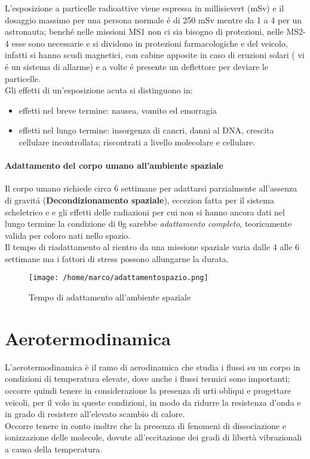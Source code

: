 \documentclass[10pt]{article}
\begin{document}
L'esposizione a particelle radioattive viene espressa in millisievert (mSv) e il dosaggio massimo per una persona normale é di 250 mSv mentre da 1 a 4 per un astronauta; benché nelle missioni MS1 non ci sia bisogno di protezioni, nelle MS2-4 esse sono necessarie e si dividono in protezioni farmacologiche e del veicolo, infatti si hanno scudi magnetici, con cabine apposite in caso di eruzioni solari ( vi é un sistema di allarme) e a volte é presente un deflettore per deviare le particelle. \\
Gli effetti di un'esposizione acuta si distinguono  in:
\begin{itemize}
\item effetti nel breve termine: nausea, vomito ed emorragia
\item effetti nel lungo termine: insorgenza di cancri, danni al DNA, crescita cellulare incontrollata; riscontrati a livello molecolare e cellulare.
\end{itemize}

\paragraph{Adattamento del corpo umano all'ambiente spaziale}

Il corpo umano richiede circa 6 settimane per adattarsi parzialmente all'assenza di gravitá (\textbf{Decondizionamento spaziale}), eccezion fatta per il sistema scheletrico e e gli effetti delle radiazioni per cui non si hanno ancora dati nel lungo termine \textrightarrow la condizione di 0g sarebbe \textit{adattamento completo}, teoricamente valida per coloro nati nello spazio. \\ Il tempo di riadattamento al rientro da una missione spaziale varia dalle 4 alle 6 settimane ma i fattori di stress possono allungarne la durata.

\begin{figure}[h!]
\centering
\texttt{[image: /home/marco/adattamentospazio.png]}
\caption{Tempo di adattamento all'ambiente spaziale}
\label{fig:tempo_adatt}
\end{figure}


\section{Aerotermodinamica}
L'aerotermodinamica è il ramo di aerodinamica che studia i flussi su un corpo in condizioni  di temperatura elevate, dove anche i flussi termici sono importanti; occorre quindi tenere in considerazione la presenza di urti obliqui e progettare veicoli, per il volo in queste condizioni, in modo da ridurre la resistenza d'onda e in grado di resistere all'elevato scambio di calore.\\
Occorre tenere in conto inoltre che la presenza di fenomeni di dissociazione e ionizzazione delle molecole, dovute all'eccitazione dei gradi di libertà vibrazionali a causa della temperatura.
\end{document}
